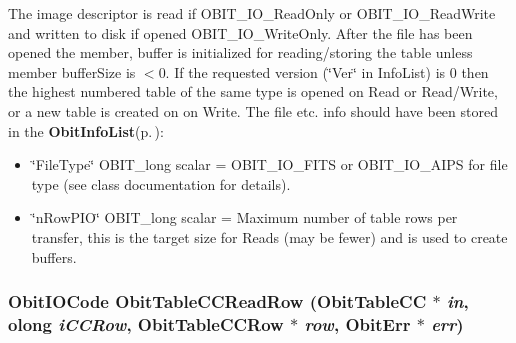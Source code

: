 The image descriptor is read if OBIT\_\-IO\_\-Read\-Only or OBIT\_\-IO\_\-Read\-Write and written to disk if opened OBIT\_\-IO\_\-Write\-Only. After the file has been opened the member, buffer is initialized for reading/storing the table unless member buffer\-Size is $<$0. If the requested version (\char`\"{}Ver\char`\"{} in Info\-List) is 0 then the highest numbered table of the same type is opened on Read or Read/Write, or a new table is created on on Write. The file etc. info should have been stored in the {\bf Obit\-Info\-List}{\rm (p.\,\pageref{structObitInfoList})}: \begin{itemize}
\item \char`\"{}File\-Type\char`\"{} OBIT\_\-long scalar = OBIT\_\-IO\_\-FITS or OBIT\_\-IO\_\-AIPS for file type (see class documentation for details). \item \char`\"{}n\-Row\-PIO\char`\"{} OBIT\_\-long scalar = Maximum number of table rows per transfer, this is the target size for Reads (may be fewer) and is used to create buffers. 
\end{itemize}
\subsubsection{\setlength{\rightskip}{0pt plus 5cm}Obit\-IOCode Obit\-Table\-CCRead\-Row ({\bf Obit\-Table\-CC} $\ast$ {\em in}, {\bf olong} {\em i\-CCRow}, {\bf Obit\-Table\-CCRow} $\ast$ {\em row}, {\bf Obit\-Err} $\ast$ {\em err})}\label{ObitTableCC_8h_a18}


